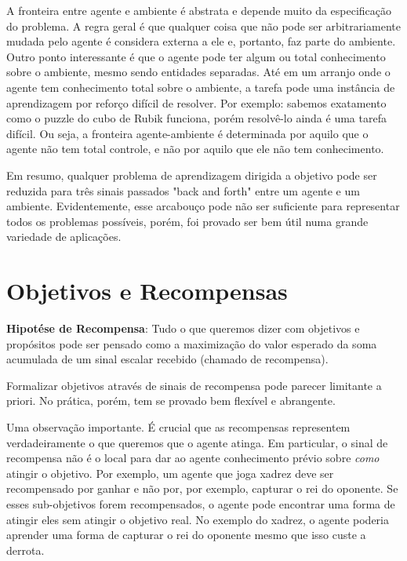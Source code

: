 \documentclass{article}
\begin{document}
A fronteira entre agente e ambiente é abstrata e depende muito da especificação do problema. A regra geral é que qualquer coisa que não pode ser arbitrariamente mudada pelo agente é considera externa a ele e, portanto, faz parte do ambiente. Outro ponto interessante é que o agente pode ter algum ou total conhecimento sobre o ambiente, mesmo sendo entidades separadas. Até em um arranjo onde o agente tem conhecimento total sobre o ambiente, a tarefa pode uma instância de aprendizagem por reforço difícil de resolver. Por exemplo: sabemos exatamento como o puzzle do cubo de Rubik funciona, porém resolvê-lo ainda é uma tarefa difícil. Ou seja, a fronteira agente-ambiente é determinada por aquilo que o agente não tem total controle, e não por aquilo que ele não tem conhecimento.

Em resumo, qualquer problema de aprendizagem dirigida a objetivo pode ser reduzida para três sinais passados "back and forth" entre um agente e um ambiente. Evidentemente, esse arcabouço pode não ser suficiente para representar todos os problemas possíveis, porém, foi provado ser bem útil numa grande variedade de aplicações.

\section{Objetivos e Recompensas}

\textbf{Hipotése de Recompensa}: Tudo o que queremos dizer com objetivos e propósitos pode ser pensado como a maximização do valor esperado da soma acumulada de um sinal escalar recebido (chamado de recompensa).


\vspace{5mm}

Formalizar objetivos através de sinais de recompensa pode parecer limitante a priori. No prática, porém, tem se provado bem flexível e abrangente. 

Uma observação importante. É crucial que as recompensas representem verdadeiramente o que queremos que o agente atinga. Em particular, o sinal de recompensa não é o local para dar ao agente conhecimento prévio sobre \textit{como} atingir o objetivo. Por exemplo, um agente que joga xadrez deve ser recompensado por ganhar e não por, por exemplo, capturar o rei do oponente. Se esses sub-objetivos forem recompensados, o agente pode encontrar uma forma de atingir eles sem atingir o objetivo real. No exemplo do xadrez, o agente poderia aprender uma forma de capturar o rei do oponente mesmo que isso custe a derrota. 
\end{document}
